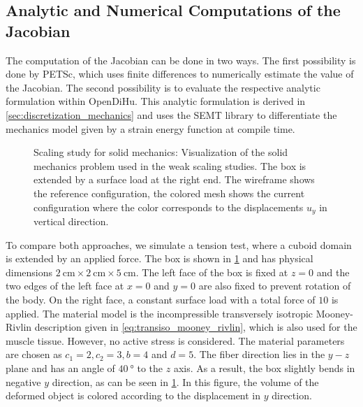 \subsection{Analytic and Numerical Computations of the Jacobian}\label{sec:analytic_numeric_jacobian}

The computation of the Jacobian can be done in two ways. The first possibility is done by PETSc, which uses finite differences to numerically estimate the value of the Jacobian. The second possibility is to evaluate the respective analytic formulation within OpenDiHu. This analytic formulation is derived in \cref{sec:discretization_mechanics} and uses the SEMT library \cite{semt} to differentiate the mechanics model given by a strain energy function at compile time.

\begin{figure}
  \centering%
  \def\svgwidth{0.6\textwidth}
  \caption{Scaling study for solid mechanics: Visualization of the solid mechanics problem used in the weak scaling studies. The box is extended by a surface load at the right end. The wireframe shows the reference configuration, the colored mesh shows the current configuration where the color corresponds to the displacements $u_y$ in vertical direction.}%
  \label{fig:mechanic_scenario}%
\end{figure}

To compare both approaches, we simulate a tension test, where a cuboid domain is extended by an applied force. 
The box is shown in \cref{fig:mechanic_scenario} and has physical dimensions $\SI{2}{\cm} \times \SI{2}{\cm} \times \SI{5}{\cm}$. The left face of the box is fixed at $z=0$ and the two edges of the left face at $x=0$ and $y=0$ are also fixed to prevent rotation of the body. On the right face, a constant surface load with a total force of $10$ is applied.
The material model is the incompressible transversely isotropic Mooney-Rivlin description given in \cref{eq:transiso_mooney_rivlin}, which is also used for the muscle tissue. However, no active stress is considered. The material parameters are chosen as $c_1=2, c_2=3, b = 4$ and $d = 5$. The fiber direction lies in the $y-z$ plane and has an angle of $\SI{40}{\degree}$ to the $z$ axis.
As a result, the box slightly bends in negative $y$ direction, as can be seen in \cref{fig:mechanic_scenario}. In this figure, the volume of the deformed object is colored according to the displacement in $y$ direction.

